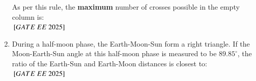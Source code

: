 \documentclass[journal,12pt,onecolumn]{IEEEtran}
\theoremstyle{remark}
\begin{document}
\begin{enumerate}
 

As per this rule, the \textbf{maximum} number of crosses possible in the empty column is:
 \\    
\hfill ${}\left[GATE\ EE\ 2025\right]$
    \begin{enumerate}
    \end{enumerate}

   \item During a half-moon phase, the Earth-Moon-Sun form a right triangle. If the Moon-Earth-Sun angle at this half-moon phase is measured to be $89.85^\circ$, the ratio of the Earth-Sun and Earth-Moon distances is closest to: \\    
\hfill ${}\left[GATE\ EE\ 2025\right]$
    \begin{enumerate}
    \end{enumerate}


\end{enumerate}
\end{document}
